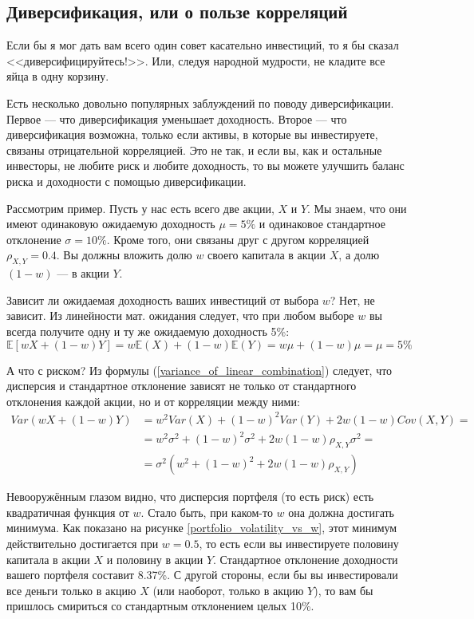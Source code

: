 \subsection{Диверсификация, или о пользе корреляций}

Если бы я мог дать вам всего один совет касательно инвестиций, то я бы сказал 
<<диверсифицируйтесь!>>. Или, следуя народной мудрости, не кладите все яйца в 
одну корзину. 

Есть несколько довольно популярных заблуждений по поводу диверсификации. Первое 
--- что диверсификация уменьшает доходность. Второе --- что диверсификация 
возможна, только если активы, в которые вы инвестируете, связаны отрицательной 
корреляцией. Это не так, и если вы, как и остальные инвесторы, не любите риск и 
любите доходность, то вы можете улучшить баланс риска и доходности с помощью 
диверсификации.

Рассмотрим пример. Пусть у нас есть всего две акции, $X$ и $Y$. Мы знаем, что 
они имеют одинаковую ожидаемую доходность $\mu=5\%$ и одинаковое стандартное 
отклонение $\sigma=10\%$. Кроме того, они связаны друг с другом корреляцией
$\rho_{X,Y} = 0.4$. Вы должны вложить долю $w$ своего капитала в акции $X$, а 
долю $(1-w)$ --- в акции $Y$.

Зависит ли ожидаемая доходность ваших инвестиций от выбора $w$? Нет, не зависит. 
Из линейности мат. ожидания следует, что при любом выборе $w$ вы всегда получите 
одну и ту же ожидаемую доходность 5\%:
\begin{equation*}
\mathbb{E}\left[ wX + (1-w)Y\right] =
w\mathbb{E}(X) + (1-w)\mathbb{E}(Y) = w\mu + (1-w)\mu = \mu = 5\%
\end{equation*}

А что с риском? Из формулы (\ref{variance_of_linear_combination}) следует, что 
дисперсия и стандартное отклонение зависят не только от стандартного отклонения 
каждой акции, но и от корреляции между ними:
\begin{align*}
Var(wX + (1-w)Y)
&= w^2Var(X) + (1-w)^2Var(Y) + 2w(1-w)Cov(X,Y) = \\
&= w^2\sigma^2 + (1-w)^2\sigma^2 + 2w(1-w)\rho_{X,Y}\sigma^2 = \\
&= \sigma^2\left(w^2 + (1-w)^2 + 2w(1-w)\rho_{X,Y} \right)
\end{align*}

Невооружённым глазом видно, что дисперсия портфеля (то есть риск) есть 
квадратичная функция от $w$. Стало быть, при каком-то $w$ она должна достигать 
минимума. Как показано на рисунке \ref{portfolio_volatility_vs_w}, этот минимум 
действительно достигается при $w=0.5$, то есть если вы инвестируете половину 
капитала в акции $X$ и половину в акции $Y$. Стандартное отклонение доходности 
вашего портфеля составит 8.37\%. С другой стороны, если бы вы инвестировали все 
деньги только в акцию $X$ (или наоборот, только в акцию $Y$), то вам бы пришлось 
смириться со стандартным отклонением целых 10\%.

